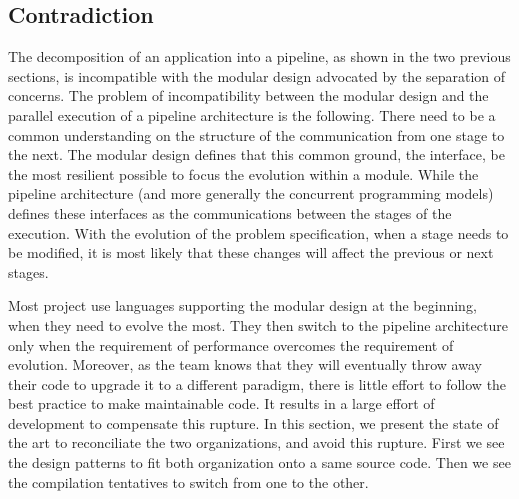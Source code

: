 \subsection{Contradiction}

The decomposition of an application into a pipeline, as shown in the two previous sections, is incompatible with the modular design advocated by the separation of concerns.
The problem of incompatibility between the modular design and the parallel execution of a pipeline architecture is the following.
There need to be a common understanding on the structure of the communication from one stage to the next.
The modular design defines that this common ground, the interface, be the most resilient possible to focus the evolution within a module.
While the pipeline architecture (and more generally the concurrent programming models) defines these interfaces as the communications between the stages of the execution.
With the evolution of the problem specification, when a stage needs to be modified, it is most likely that these changes will affect the previous or next stages.

Most project use languages supporting the modular design at the beginning, when they need to evolve the most.
They then switch to the pipeline architecture only when the requirement of performance overcomes the requirement of evolution.
Moreover, as the team knows that they will eventually throw away their code to upgrade it to a different paradigm, there is little effort to follow the best practice to make maintainable code.
It results in a large effort of development to compensate this rupture.
In this section, we present the state of the art to reconciliate the two organizations, and avoid this rupture.
First we see the design patterns to fit both organization onto a same source code.
Then we see the compilation tentatives to switch from one to the other.